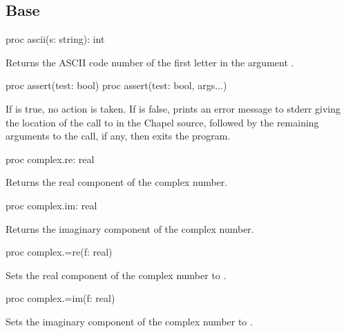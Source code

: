 \subsection{Base}
\label{Standard}

\begin{protohead}
proc ascii(s: string): int
\end{protohead}
\begin{protobody}
Returns the ASCII code number of the first letter in the
argument .
\end{protobody}

\begin{protohead}
proc assert(test: bool)
proc assert(test: bool, args...)
\end{protohead}
\begin{protobody}
If  is true, no action is taken.
If  is false,
prints an error message to stderr giving the location of the call to 
in the Chapel source, followed by the remaining arguments to the call, if any,
then exits the program.
\end{protobody}

\begin{protohead}
proc complex.re: real
\end{protohead}
\begin{protobody}
Returns the real component of the complex number.
\end{protobody}

\begin{protohead}
proc complex.im: real
\end{protohead}
\begin{protobody}
Returns the imaginary component of the complex number.
\end{protobody}

\begin{protohead}
proc complex.=re(f: real)
\end{protohead}
\begin{protobody}
Sets the real component of the complex number to .
\end{protobody}

\begin{protohead}
proc complex.=im(f: real)
\end{protohead}
\begin{protobody}
Sets the imaginary component of the complex number to .
\end{protobody}

